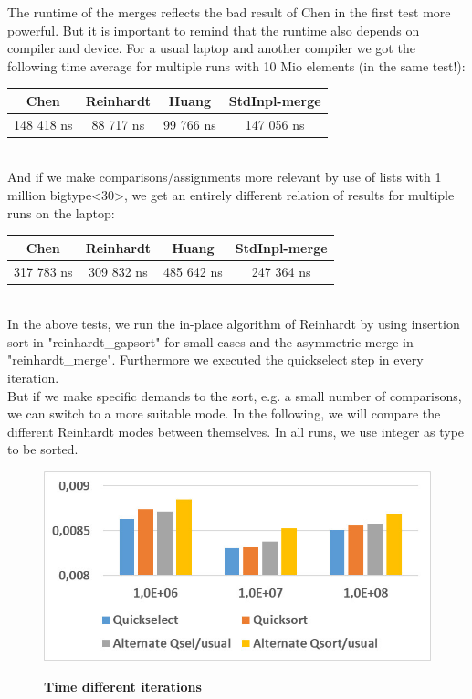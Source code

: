 \documentclass[11pt,pdftex,a4paper, twocolumn]{article}
\begin{document}
The runtime of the merges reflects the bad result of Chen in the first test more powerful. But it is important to remind that the runtime also depends on compiler and device. For a usual laptop and another compiler we got the following time average for multiple runs with 10 Mio elements (in the same test!): \\
\scriptsize
\begin{tabular}{|c|c|c|c|} \hline
Chen & Reinhardt & Huang & StdInpl-merge \\ \hline
148 418 ns & 88 717 ns & 99 766 ns & 147 056 ns \\ \hline
\end{tabular}
\normalsize \\
And if we make comparisons/assignments more relevant by use of lists with 1 million bigtype<30>, we get an entirely different relation of results for multiple runs on the laptop: \\
\scriptsize
\begin{tabular}{|c|c|c|c|} \hline
Chen & Reinhardt & Huang & StdInpl-merge \\ \hline
317 783 ns & 309 832 ns & 485 642 ns & 247 364 ns \\ \hline
\end{tabular}
\normalsize \\
In the above tests, we run the in-place algorithm of Reinhardt by using insertion sort in "reinhardt\_gapsort" for small cases and the asymmetric merge in "reinhardt\_merge". Furthermore we executed the quickselect step in every iteration. \\
But if we make specific demands to the sort, e.g. a small number of comparisons, we can switch to a more suitable mode. In the following, we will compare the different Reinhardt modes between themselves. In all runs, we use integer as type to be sorted. \\
\begin{figure}[H]
\includegraphics[width=\linewidth]{Diagramm-Bilder/diff-iterations-time.JPG} \\
\caption{\textbf{Time different iterations}} \label{fig:diff-iterations-time}
\end{figure}
\end{document}
